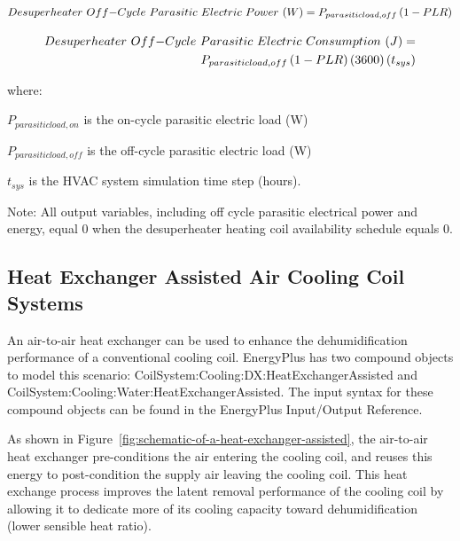 \begin{equation}
Desuperheater~Off{\rm{ - }}Cycle~Parasitic~Electric~Power~(W) = {P_{parasiticload,off}}\left( {1 - PLR} \right)
\end{equation}

\begin{equation}
\begin{split}
Desuperheater~Off{\rm{ - }}Cycle~Parasitic~Electric~Consumption~(J) = \\{P_{parasiticload,off}}\left( {1 - PLR} \right)\left( {3600} \right)\left( {{t_{sys}}} \right)
\end{split}
\end{equation}

where:

\({P_{parasiticload,on}}\) is the on-cycle parasitic electric load (W)

\({P_{parasiticload,off}}\) is the off-cycle parasitic electric load (W)

\({t_{sys}}\) is the HVAC system simulation time step (hours).

Note: All output variables, including off cycle parasitic electrical power and energy, equal 0 when the desuperheater heating coil availability schedule equals 0.

\subsection{Heat Exchanger Assisted Air Cooling Coil Systems}\label{heat-exchanger-assisted-air-cooling-coil-systems}

An air-to-air heat exchanger can be used to enhance the dehumidification performance of a conventional cooling coil. EnergyPlus has two compound objects to model this scenario: CoilSystem:Cooling:DX:HeatExchangerAssisted and CoilSystem:Cooling:Water:HeatExchangerAssisted. The input syntax for these compound objects can be found in the EnergyPlus Input/Output Reference.

As shown in Figure~\ref{fig:schematic-of-a-heat-exchanger-assisted}, the air-to-air heat exchanger pre-conditions the air entering the cooling coil, and reuses this energy to post-condition the supply air leaving the cooling coil. This heat exchange process improves the latent removal performance of the cooling coil by allowing it to dedicate more of its cooling capacity toward dehumidification (lower sensible heat ratio).

